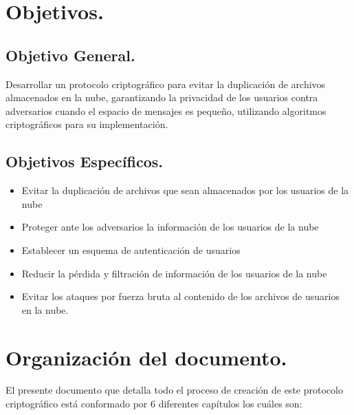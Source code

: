 \section{Objetivos. } %

    \subsection{Objetivo General.} %
    Desarrollar un protocolo criptográfico para evitar la duplicación de archivos almacenados en la nube, garantizando la privacidad de los usuarios contra adversarios cuando el espacio de mensajes es pequeño, utilizando algoritmos criptográficos para su implementación. 
     
    \subsection{Objetivos Específicos.} %
	\begin{itemize}
		\item Evitar la duplicación de archivos que sean almacenados por los usuarios de la nube
		\item Proteger ante los adversarios la información de los usuarios de la nube
		\item Establecer un esquema de autenticación de usuarios 
		\item Reducir la pérdida y filtración de información de los usuarios de la nube
		\item Evitar los ataques por fuerza bruta al contenido de los archivos de usuarios en la nube. 
 	\end{itemize}

\section{Organización del documento. }

El presente documento que detalla todo el proceso de creación de este protocolo criptográfico está conformado por 6 diferentes capítulos los cuáles son: 

